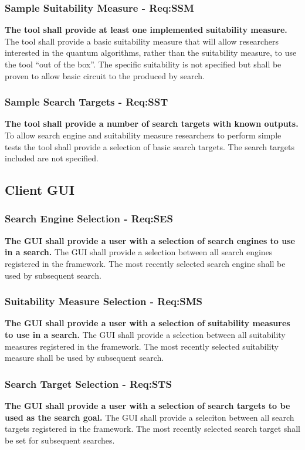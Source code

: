 \subsubsection{Sample Suitability Measure - Req:SSM}
\label{sec:reqssm}
\textbf{The tool shall provide at least one implemented suitability measure.}
The tool shall provide a basic suitability measure that will allow researchers interested in the quantum algorithms, rather than the suitability measure, to use the tool ``out of the box''.
The specific suitability is not specified but shall be proven to allow basic circuit to the produced by search.

\subsubsection{Sample Search Targets - Req:SST}
\label{sec:reqsst}
\textbf{The tool shall provide a number of search targets with known outputs.}
To allow search engine and suitability measure researchers to perform simple tests the tool shall provide a selection of basic search targets.
The search targets included are not specified.

\subsection{Client GUI}
\label{sec:clientguireqs}
\subsubsection{Search Engine Selection - Req:SES}
\label{sec:reqses}
\textbf{The GUI shall provide a user with a selection of search engines to use in a search.}
The GUI shall provide a selection between all search engines registered in the framework.
The most recently selected search engine shall be used by subsequent search.

\subsubsection{Suitability Measure Selection - Req:SMS}
\label{sec:reqsms}
\textbf{The GUI shall provide a user with a selection of suitability measures to use in a search.}
The GUI shall provide a selection between all suitability measures registered in the framework.
The most recently selected suitability measure shall be used by subsequent search.

\subsubsection{Search Target Selection - Req:STS}
\label{sec:reqsts}
\textbf{The GUI shall provide a user with a selection of search targets to be used as the search goal.}
The GUI shall provide a seleciton between all search targets registered in the framework.
The most recently selected search target shall be set for subsequent searches.


